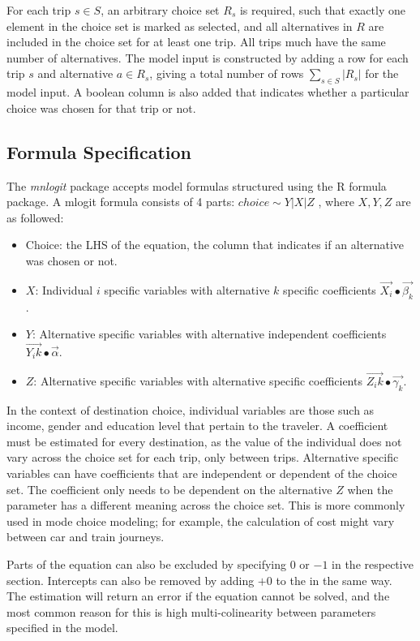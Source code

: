 For each trip $s \in S$, an arbitrary choice set $R_s$ is required, such that exactly one element in the choice set is marked as selected, and all alternatives in $R$ are included in the choice set for at least one trip. All trips much have the same number of alternatives.
The model input is constructed by adding a row for each trip $s$ and alternative $a \in R_s$, giving a total number of rows  $ \sum_{s \in S} |R_s| $  for the model input. A boolean column is also added that indicates whether a particular choice was chosen for that trip or not.

\subsection*{Formula Specification}
The \textit{mnlogit} package accepts model formulas structured using the R formula package. A mlogit formula consists of 4 parts: $ choice \sim Y | X | Z $ , where $X,Y,Z$ are as followed:

\begin{itemize}
	\item Choice: the LHS of the equation, the column that indicates if an alternative was chosen or not.
	\item $X$: Individual $i$ specific variables with alternative $k$ specific coefficients $\vec{X_i} ∙\vec{\beta_k}$.

	\item $Y$: Alternative specific variables with alternative independent coefficients $\vec{Y_ik} ∙\vec{\alpha}$. 
	\item $Z$: Alternative specific variables with alternative specific coefficients
$\vec{Z_ik} ∙\vec{\gamma_k}$.
\end{itemize}

In the context of destination choice, individual variables are those such as income, gender and education level that pertain to the traveler. A coefficient must be estimated for every destination, as the value of the individual does not vary across the choice set for each trip, only between trips. Alternative specific variables can have coefficients that are independent or dependent of the choice set. The coefficient only needs to be dependent on the alternative $Z$ when the parameter has a different meaning across the choice set. This is more commonly used in mode choice modeling; for example, the calculation of cost might vary between car and train journeys.

Parts of the equation can also be excluded by specifying $0$ or $-1$ in the respective section. Intercepts can also be removed by adding $+ 0$ to the in the same way. The estimation will return an error if the equation cannot be solved, and the most common reason for this is high multi-colinearity between parameters specified in the model.

